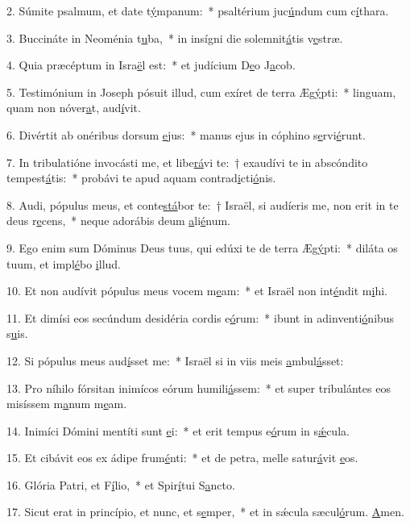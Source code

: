 2. Súmite psalmum, et date t\uline{ý}mpanum:~* psaltérium juc\uline{ú}ndum cum c\uline{í}thara.\par 
3. Buccináte in Neoménia t\uline{u}ba,~* in insígni die solemnit\uline{á}tis v\uline{e}stræ.\par 
4. Quia præcéptum in Isra\uline{ë}l est:~* et judícium D\uline{e}o J\uline{a}cob.\par 
5. Testimónium in Joseph pósuit illud, cum exíret de terra Æg\uline{ý}pti:~* linguam, quam non nóver\uline{a}t, aud\uline{í}vit.\par 
6. Divértit ab onéribus dorsum \uline{e}jus:~* manus ejus in cóphino s\uline{e}rvi\uline{é}runt.\par 
7. In tribulatióne invocásti me, et libe\uline{rá}vi te:~† exaudívi te in abscóndito tempest\uline{á}tis:~* probávi te apud aquam contrad\uline{i}cti\uline{ó}nis.\par 
8. Audi, pópulus meus, et conte\uline{stá}bor te:~† Israël, si audíeris me, non erit in te deus r\uline{e}cens,~* neque adorábis deum \uline{a}li\uline{é}num.\par 
9. Ego enim sum Dóminus Deus tuus, qui edúxi te de terra Æg\uline{ý}pti:~* diláta os tuum, et impl\uline{é}bo \uline{i}llud.\par 
10. Et non audívit pópulus meus vocem m\uline{e}am:~* et Israël non int\uline{é}ndit m\uline{i}hi.\par 
11. Et dimísi eos secúndum desidéria cordis e\uline{ó}rum:~* ibunt in adinventi\uline{ó}nibus s\uline{u}is.\par 
12. Si pópulus meus aud\uline{í}sset me:~* Israël si in viis meis \uline{a}mbul\uline{á}sset:\par 
13. Pro níhilo fórsitan inimícos eórum humili\uline{á}ssem:~* et super tribulántes eos misíssem m\uline{a}num m\uline{e}am.\par 
14. Inimíci Dómini mentíti sunt \uline{e}i:~* et erit tempus e\uline{ó}rum in s\uline{ǽ}cula.\par 
15. Et cibávit eos ex ádipe frum\uline{é}nti:~* et de petra, melle satur\uline{á}vit \uline{e}os.\par 
16. Glória Patri, et F\uline{í}lio,~* et Spir\uline{í}tui S\uline{a}ncto.\par 
17. Sicut erat in princípio, et nunc, et s\uline{e}mper,~* et in sǽcula sæcul\uline{ó}rum. \uline{A}men.\par 
